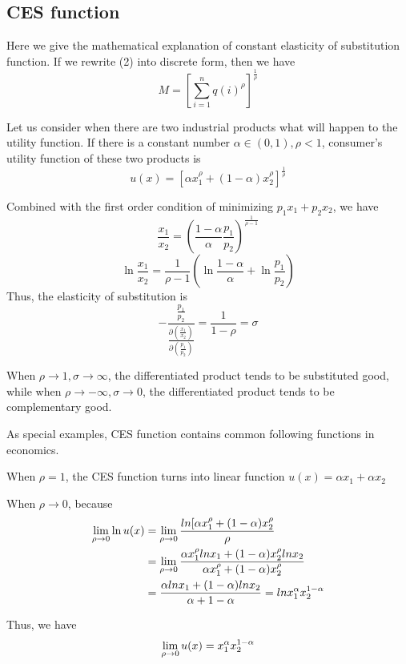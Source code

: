 \documentclass{article}
\begin{document}
\subsection{CES function}
Here we give the mathematical explanation of constant elasticity of substitution function. If we rewrite (2) into discrete form, then we have
$$M = [\sum_{i=1}^n q(i)^{\rho}]^{\frac{1}{\rho}}$$

Let us consider when there are two industrial products what will happen to the utility function. If there is a constant number $\alpha \in (0,1), \rho <1$, consumer's utility function of these two products is
$$u(x) = [\alpha x_1^{\rho} + (1-\alpha) x_2^{\rho}]^{\frac{1}{\rho}}$$

Combined with the first order condition of minimizing $p_1x_1 + p_2x_2$, we have 
$$\frac{x_1}{x_2} = (\frac{1-\alpha}{\alpha} \frac{p_1}{p_2})^{\frac{1}{\rho -1}}$$
$$\ln{\frac{x_1}{x_2}} = \frac{1}{\rho -1}(\ln{\frac{1-\alpha}{\alpha}} + \ln{\frac{p_1}{p_2}})$$
Thus, the elasticity of substitution is 
$$- \frac{\frac{p_1}{p_2}}{\frac{\partial(\frac{x_1}{x_2})}{\partial({\frac{p_1}{p_2}})}} = \frac{1}{1-\rho} = \sigma$$

When $\rho \rightarrow 1, \sigma \rightarrow \infty$, the differentiated product tends to be substituted good, while when $\rho \rightarrow - \infty, \sigma \rightarrow 0$, the differentiated product tends to be complementary good. 

As special examples, CES function contains common following functions in economics.

When $\rho = 1$, the CES function turns into linear function $u(x) = \alpha x_1 + \alpha x_2$

When $\rho \rightarrow 0$, because
\begin{equation}
    \notag
    \begin{aligned}
     \lim_{\rho \rightarrow 0} \ln{u(x)} &= \lim_{\rho \rightarrow 0} \frac{ln[\alpha x_1^{\rho}+ (1-\alpha ) x^{\rho}_2}{\rho} \\ &= \lim_{\rho \rightarrow 0} \frac{\alpha x_1^{\rho}lnx_1+ (1-\alpha)x^{\rho}_2 lnx_2}{\alpha x_1^{\rho}+ (1-\alpha) x^{\rho}_2} \\
     &= \frac{\alpha lnx_1 + (1-\alpha) lnx_2 }{\alpha +1 - \alpha} = ln x_1^{\alpha} x_2^{1-\alpha}
    \end{aligned}
\end{equation}
    
Thus, we have 
\begin{equation}
    \notag
    \lim_{\rho \rightarrow 0}u(x) = x_1^{\alpha}x_2^{1 - \alpha}
\end{equation}
\end{document}
